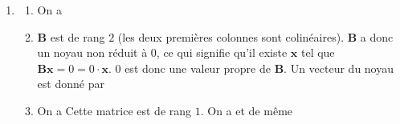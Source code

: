 \documentclass{article}
\begin{document}
	\begin{enumerate}
		\item 
		\begin{enumerate}
			\item On a
			
			\item $\mathbf{B}$ est de rang $2$ (les deux premières colonnes sont colinéaires). $\mathbf{B}$ a donc un noyau non réduit à $0$, ce qui signifie qu'il existe $\mathbf{x}$ tel que $\mathbf{B}\mathbf{x} = 0 = 0 \cdot\mathbf{x}$. $0$ est donc une valeur propre de $\mathbf{B}$. Un vecteur du noyau est donné par
			
			\item On a
			Cette matrice est de rang $1$.
			On a
			et de même
			

\end{enumerate}
\end{enumerate}
\end{document}
